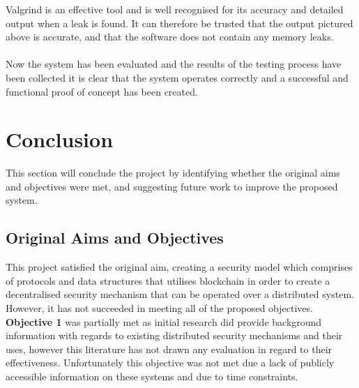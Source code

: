 \documentclass[a4paper, 11pt]{report}
\begin{document}
Valgrind is an effective tool and is well recognised for its accuracy and detailed output when a leak is found. It can therefore be trusted that the output pictured above is accurate, and that the software does not contain any memory leaks.\\\\

Now the system has been evaluated and the results of the testing process have been collected it is clear that the system operates correctly and a successful and functional proof of concept has been created.

\chapter{Conclusion}

This section will conclude the project by identifying whether the original aims and objectives were met, and suggesting future work to improve the proposed system.

\section{Original Aims and Objectives}
This project satisfied the original aim, creating a security model which comprises of protocols and data structures that utilises \gls{blockchain} in order to create a decentralised security mechanism that can be operated over a distributed system. However, it has not succeeded in meeting all of the proposed objectives.\\


\textbf{Objective 1} was partially met as initial research did provide background information with regards to existing distributed security mechanisms and their uses, however this literature has not drawn any evaluation in regard to their effectiveness. Unfortunately this objective was not met due a lack of publicly accessible information on these systems and due to time constraints.\\
\end{document}
